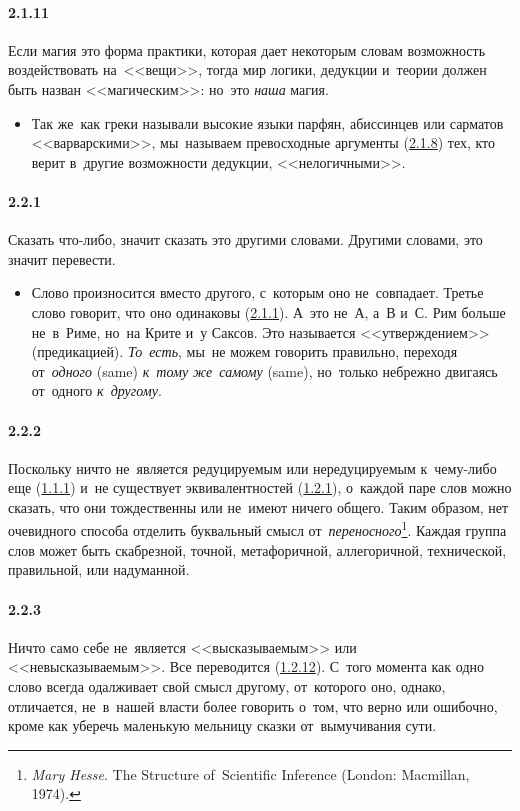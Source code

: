 \paragraph{2.1.11}\hypertarget{par:2.1.11}{} Если магия это форма практики, которая дает некоторым словам возможность воздействовать на~<<вещи>>, тогда мир логики, дедукции и~теории должен быть назван <<магическим>>: но~это {\itshape наша} магия. 
	\begin{itemize}
	\item 
	Так же~как греки называли высокие языки парфян, абиссинцев или сарматов <<варварскими>>, мы~называем превосходные аргументы (\hyperlink{par:2.1.8}{2.1.8}) тех, кто верит в~другие возможности дедукции, <<нелогичными>>.
	\end{itemize}

\paragraph{2.2.1}\hypertarget{par:2.2.1}{} Сказать что-либо, значит сказать это другими словами. Другими словами, это значит перевести.
	\begin{itemize}
	\item 
	Слово произносится вместо другого, с~которым оно не~совпадает. Третье слово говорит, что оно одинаковы (\hyperlink{par:2.1.1}{2.1.1}). А~это не~А, а~В и~С. Рим больше не~в~Риме, но~на Крите и~у Саксов. Это называется <<утверждением>> (предикацией). {\itshape То~есть}, мы~не можем говорить правильно, переходя от~{\itshape одного} (same) {\itshape к~тому же~самому} (same), но~только небрежно двигаясь от~одного {\itshape к~другому}.
	\end{itemize}

\paragraph{2.2.2}\hypertarget{par:2.2.2}{} Поскольку ничто не~является редуцируемым или нередуцируемым к~чему-либо еще (\hyperlink{par:1.1.1}{1.1.1}) и~не существует эквивалентностей (\hyperlink{par:1.2.1}{1.2.1}), о~каждой паре слов можно сказать, что они тождественны или не~имеют ничего общего. Таким образом, нет очевидного способа отделить буквальный смысл от~{\itshape переносного}\footnote{{\itshape Mary Hesse}. The Structure of~Scientific Inference (London: Macmillan, 1974).}. Каждая группа слов может быть скабрезной, точной, метафоричной, аллегоричной, технической, правильной, или надуманной.

\paragraph{2.2.3}\hypertarget{par:2.2.3}{} Ничто само себе не~является <<высказываемым>> или <<невысказываемым>>. Все переводится (\hyperlink{par:1.2.12}{1.2.12}). С~того момента как одно слово всегда одалживает свой смысл другому, от~которого оно, однако, отличается, не~в~нашей власти более говорить о~том, что верно или ошибочно, кроме как уберечь маленькую мельницу сказки от~вымучивания сути.

